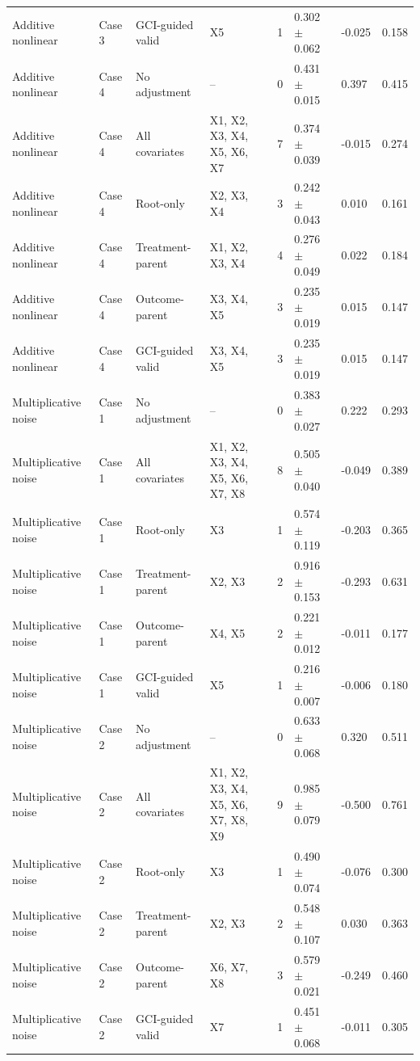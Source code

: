 \begin{tabular}{llllrlll}
Additive nonlinear & Case 3 & GCI-guided valid & X5 & 1 & 0.302 $\pm$ 0.062 & -0.025 & 0.158 \\
Additive nonlinear & Case 4 & No adjustment & -- & 0 & 0.431 $\pm$ 0.015 & 0.397 & 0.415 \\
Additive nonlinear & Case 4 & All covariates & X1, X2, X3, X4, X5, X6, X7 & 7 & 0.374 $\pm$ 0.039 & -0.015 & 0.274 \\
Additive nonlinear & Case 4 & Root-only & X2, X3, X4 & 3 & 0.242 $\pm$ 0.043 & 0.010 & 0.161 \\
Additive nonlinear & Case 4 & Treatment-parent & X1, X2, X3, X4 & 4 & 0.276 $\pm$ 0.049 & 0.022 & 0.184 \\
Additive nonlinear & Case 4 & Outcome-parent & X3, X4, X5 & 3 & 0.235 $\pm$ 0.019 & 0.015 & 0.147 \\
Additive nonlinear & Case 4 & GCI-guided valid & X3, X4, X5 & 3 & 0.235 $\pm$ 0.019 & 0.015 & 0.147 \\
Multiplicative noise & Case 1 & No adjustment & -- & 0 & 0.383 $\pm$ 0.027 & 0.222 & 0.293 \\
Multiplicative noise & Case 1 & All covariates & X1, X2, X3, X4, X5, X6, X7, X8 & 8 & 0.505 $\pm$ 0.040 & -0.049 & 0.389 \\
Multiplicative noise & Case 1 & Root-only & X3 & 1 & 0.574 $\pm$ 0.119 & -0.203 & 0.365 \\
Multiplicative noise & Case 1 & Treatment-parent & X2, X3 & 2 & 0.916 $\pm$ 0.153 & -0.293 & 0.631 \\
Multiplicative noise & Case 1 & Outcome-parent & X4, X5 & 2 & 0.221 $\pm$ 0.012 & -0.011 & 0.177 \\
Multiplicative noise & Case 1 & GCI-guided valid & X5 & 1 & 0.216 $\pm$ 0.007 & -0.006 & 0.180 \\
Multiplicative noise & Case 2 & No adjustment & -- & 0 & 0.633 $\pm$ 0.068 & 0.320 & 0.511 \\
Multiplicative noise & Case 2 & All covariates & X1, X2, X3, X4, X5, X6, X7, X8, X9 & 9 & 0.985 $\pm$ 0.079 & -0.500 & 0.761 \\
Multiplicative noise & Case 2 & Root-only & X3 & 1 & 0.490 $\pm$ 0.074 & -0.076 & 0.300 \\
Multiplicative noise & Case 2 & Treatment-parent & X2, X3 & 2 & 0.548 $\pm$ 0.107 & 0.030 & 0.363 \\
Multiplicative noise & Case 2 & Outcome-parent & X6, X7, X8 & 3 & 0.579 $\pm$ 0.021 & -0.249 & 0.460 \\
Multiplicative noise & Case 2 & GCI-guided valid & X7 & 1 & 0.451 $\pm$ 0.068 & -0.011 & 0.305 \\

\end{tabular}
